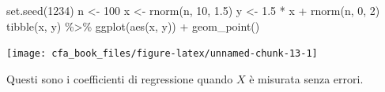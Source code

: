 \documentclass[
  11pt,
]{krantz}
\makeatletter
\newenvironment{Shaded}{\begin{snugshade}}{\end{snugshade}}
\newcommand{\AttributeTok}[1]{\textcolor[rgb]{0.61,0.61,0.61}{#1}}
\newcommand{\CommentTok}[1]{\textcolor[rgb]{0.37,0.37,0.37}{\textit{#1}}}
\newcommand{\DecValTok}[1]{\textcolor[rgb]{0.06,0.06,0.06}{#1}}
\newcommand{\FloatTok}[1]{\textcolor[rgb]{0.06,0.06,0.06}{#1}}
\newcommand{\FunctionTok}[1]{\textcolor[rgb]{0,0,0}{#1}}
\newcommand{\NormalTok}[1]{#1}
\newcommand{\OtherTok}[1]{\textcolor[rgb]{0.37,0.37,0.37}{#1}}
\newcommand{\SpecialCharTok}[1]{\textcolor[rgb]{0,0,0}{#1}}
\newenvironment{kframe}{%
\medskip{}
\setlength{\fboxsep}{.8em}
 \def\at@end@of@kframe{}%
 \ifinner\ifhmode%
  \def\at@end@of@kframe{\end{minipage}}%
  \begin{minipage}{\columnwidth}%
 \fi\fi%
 \def\FrameCommand##1{\hskip\@totalleftmargin \hskip-\fboxsep
 \colorbox{shadecolor}{##1}\hskip-\fboxsep
     \hskip-\linewidth \hskip-\@totalleftmargin \hskip\columnwidth}%
 \MakeFramed {\advance\hsize-\width
   \@totalleftmargin\z@ \linewidth\hsize
   \@setminipage}}%
 {\par\unskip\endMakeFramed%
 \at@end@of@kframe}
\renewenvironment{Shaded}{\begin{kframe}}{\end{kframe}}
\theoremstyle{definition}
\theoremstyle{definition}
\theoremstyle{definition}
\theoremstyle{definition}
\theoremstyle{remark}
\makeatother
\begin{document}
\begin{Shaded}
\begin{Highlighting}[]
\FunctionTok{set.seed}\NormalTok{(}\DecValTok{1234}\NormalTok{)}
\NormalTok{n }\OtherTok{\textless{}{-}} \DecValTok{100}
\NormalTok{x }\OtherTok{\textless{}{-}} \FunctionTok{rnorm}\NormalTok{(n, }\DecValTok{10}\NormalTok{, }\FloatTok{1.5}\NormalTok{)}
\NormalTok{y }\OtherTok{\textless{}{-}} \FloatTok{1.5} \SpecialCharTok{*}\NormalTok{ x }\SpecialCharTok{+} \FunctionTok{rnorm}\NormalTok{(n, }\DecValTok{0}\NormalTok{, }\DecValTok{2}\NormalTok{)}
\FunctionTok{tibble}\NormalTok{(x, y) }\SpecialCharTok{\%\textgreater{}\%}
  \FunctionTok{ggplot}\NormalTok{(}\FunctionTok{aes}\NormalTok{(x, y)) }\SpecialCharTok{+}
  \FunctionTok{geom\_point}\NormalTok{()}
\end{Highlighting}
\end{Shaded}

\begin{center}\texttt{[image: cfa\_book\_files/figure-latex/unnamed-chunk-13-1]} \end{center}

\begin{Shaded}
\end{Shaded}

Questi sono i coefficienti di regressione quando \(X\) è misurata senza errori.

\begin{Shaded}
\end{Shaded}
\end{document}
